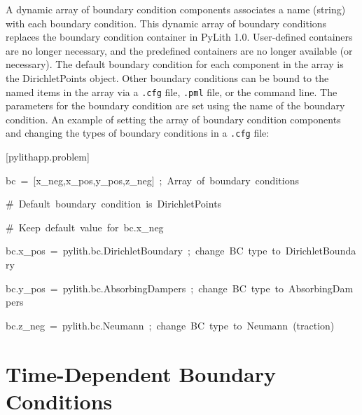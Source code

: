 A dynamic array of boundary condition components associates a name
(string) with each boundary condition. This dynamic array of boundary
conditions replaces the boundary condition container in PyLith 1.0.
User-defined containers are no longer necessary, and the predefined
containers are no longer available (or necessary). The default boundary
condition for each component in the array is the DirichletPoints object.
Other boundary conditions can be bound to the named items in the array
via a \texttt{.cfg} file, \texttt{.pml} file, or the command line.
The parameters for the boundary condition are set using the name of
the boundary condition. An example of setting the array of boundary
condition components and changing the types of boundary conditions
in a \texttt{.cfg} file:
\begin{lyxcode}
{[}pylithapp.problem{]}

bc~=~{[}x\_neg,x\_pos,y\_pos,z\_neg{]}~;~Array~of~boundary~conditions

\#~Default~boundary~condition~is~DirichletPoints

\#~Keep~default~value~for~bc.x\_neg

bc.x\_pos~=~pylith.bc.DirichletBoundary~;~change~BC~type~to~DirichletBoundary

bc.y\_pos~=~pylith.bc.AbsorbingDampers~;~change~BC~type~to~AbsorbingDampers

bc.z\_neg~=~pylith.bc.Neumann~;~change~BC~type~to~Neumann~(traction)
\end{lyxcode}

\section{\label{sec:Time:Dependent:BC}Time-Dependent Boundary Conditions}

